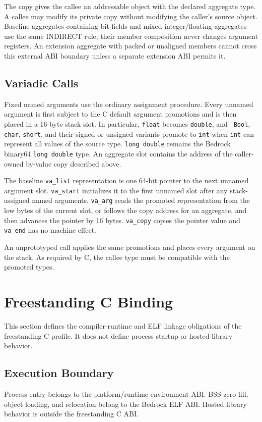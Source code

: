 \documentclass[10pt,twoside]{article}
\begin{document}
The copy gives the callee an addressable object with the declared aggregate
type. A callee may modify its private copy without modifying the caller's
source object. Baseline aggregates containing bit-fields and mixed
integer/floating aggregates use the same INDIRECT rule; their member
composition never changes argument registers. An extension aggregate with
packed or unaligned members cannot cross this external ABI boundary unless a
separate extension ABI permits it.

\subsection{Variadic Calls}
Fixed named arguments use the ordinary assignment procedure. Every unnamed
argument is first subject to the C default argument promotions and is then
placed in a 16-byte stack slot. In particular, \texttt{float} becomes
\texttt{double}, and \texttt{\_Bool}, \texttt{char}, \texttt{short}, and their
signed or unsigned variants promote to \texttt{int} when \texttt{int} can
represent all values of the source type. \texttt{long double} remains the
Bedrock binary64 \texttt{long double} type. An aggregate slot contains the
address of the caller-owned by-value copy described above.

The baseline \texttt{va\_list} representation is one 64-bit pointer to the next
unnamed argument slot. \texttt{va\_start} initializes it to the first unnamed
slot after any stack-assigned named arguments. \texttt{va\_arg} reads the
promoted representation from the low bytes of the current slot, or follows the
copy address for an aggregate, and then advances the pointer by 16 bytes.
\texttt{va\_copy} copies the pointer value and \texttt{va\_end} has no machine
effect.

An unprototyped call applies the same promotions and places every argument on
the stack. As required by C, the callee type must be compatible with the
promoted types.

\section{Freestanding C Binding}\label{page:freestanding-c-binding}
This section defines the compiler-runtime and ELF linkage obligations of the
freestanding C profile. It does not define process startup or hosted-library
behavior.

\subsection{Execution Boundary}
Process entry belongs to the platform/runtime environment ABI. BSS zero-fill,
object loading, and relocation belong to the Bedrock ELF ABI. Hosted library
behavior is outside the freestanding C ABI.
\end{document}
